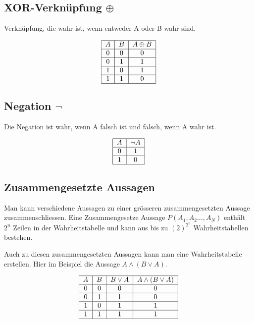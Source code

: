 \documentclass[12pt, a4paper, oneside]{article}
\begin{document}
\subsection{XOR-Verknüpfung $\oplus$}
Verknüpfung, die wahr ist, wenn entweder A oder B wahr sind.

\begin{equation*}
  \begin{tabular}{| c | c | c |}
    \hline
    $A$ & $B$ & $A \oplus B$ \\ \hline
    0 & 0 & 0 \\ \hline
    0 & 1 & 1 \\ \hline
    1 & 0 & 1 \\ \hline
    1 & 1 & 0 \\ \hline
  \end{tabular}
\end{equation*}


\subsection{Negation $\lnot$}
Die Negation ist wahr, wenn A falsch ist und falsch, wenn A wahr ist.

\begin{equation*}
  \begin{tabular}{|c |c |}
    \hline
    $A$ & $\lnot A$ \\ \hline
    0 & 1 \\ \hline
    1 & 0 \\ \hline
  \end{tabular}
\end{equation*}


\subsection{Zusammengesetzte Aussagen}
Man kann verschiedene Aussagen zu einer  grösseren zusammengesetzten Aussage zusammenschliessen. Eine Zusammengesetze Aussage $P(A_{1}, A_{2}..., A_{N})$ enthält $2^{n}$ Zeilen in der Wahrheitstabelle und kann aus bis zu $(2)^{2^{n}}$ Wahrheitstabellen bestehen.

Auch zu diesen zusammengesetzten Aussagen kann man eine Wahrheitstabelle erstellen. Hier im Beispiel die Aussage $A \land (B \lor A)$.

\begin{equation*}
  \begin{tabular}{| c | c | c | c |}
    \hline
    $A$ & $B$ & $B \lor A$ & $A \land (B \lor A)$ \\ \hline
    0 & 0 & 0 & 0 \\ \hline
    0 & 1 & 1 & 0 \\ \hline
    1 & 0 & 1 & 1 \\ \hline
    1 & 1 & 1 & 1 \\ \hline
  \end{tabular}
\end{equation*}
\end{document}

